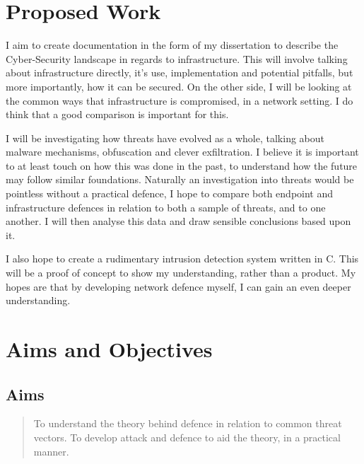 \section{Proposed Work}
\label{proposed}
I aim to create documentation in the form of my dissertation to describe the Cyber-Security landscape in regards to infrastructure. 
This will involve talking about infrastructure directly, it's use, implementation and potential pitfalls, but more importantly, how it can be secured.
On the other side, I will be looking at the common ways that infrastructure is compromised, in a network setting. 
I do think that a good comparison is important for this. 

I will be investigating how threats have evolved as a whole, talking about malware mechanisms, obfuscation and clever exfiltration. 
I believe it is important to at least touch on how this was done in the past, 
to understand how the future may follow similar foundations. Naturally an investigation into threats would be pointless without a practical defence, 
I hope to compare both endpoint and infrastructure defences in relation to both a sample of threats, and to one another. I will then analyse this data and draw sensible conclusions based upon it.

I also hope to create a rudimentary intrusion detection system written in C. This will be a proof of concept to show my understanding, rather than a product. My hopes are that by developing network defence myself, 
I can gain an even deeper understanding.

\section{Aims and Objectives}
\subsection{Aims}
\begin{quote}
	To understand the theory behind defence in relation to common threat vectors.
	To develop attack and defence to aid the theory, in a practical manner.
\end{quote}

